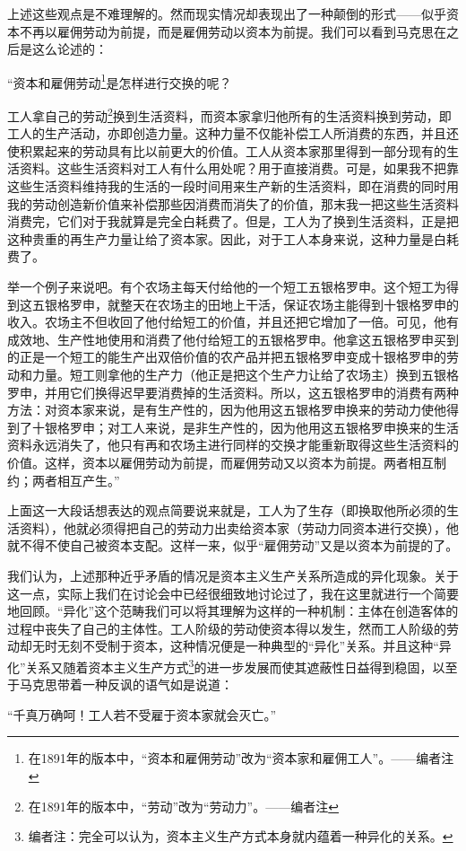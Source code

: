 \documentclass[a4paper,twoside,12pt,AutoFakeBold]{ctexart}
\begin{document}
上述这些观点是不难理解的。然而现实情况却表现出了一种颠倒的形式——似乎资本不再以雇佣劳动为前提，而是雇佣劳动以资本为前提。我们可以看到马克思在之后是这么论述的：
\begin{adjustwidth}{2em}{2em}
    \qquad\fangsong
“资本和雇佣劳动\footnote{在1891年的版本中，“资本和雇佣劳动”改为“资本家和雇佣工人”。——编者注}是怎样进行交换的呢？

工人拿自己的劳动\footnote{在1891年的版本中，“劳动”改为“劳动力”。——编者注}换到生活资料，而资本家拿归他所有的生活资料换到劳动，即工人的生产活动，亦即创造力量。这种力量不仅能补偿工人所消费的东西，并且还使积累起来的劳动具有比以前更大的价值。工人从资本家那里得到一部分现有的生活资料。这些生活资料对工人有什么用处呢？用于直接消费。可是，如果我不把靠这些生活资料维持我的生活的一段时间用来生产新的生活资料，即在消费的同时用我的劳动创造新价值来补偿那些因消费而消失了的价值，那末我一把这些生活资料消费完，它们对于我就算是完全白耗费了。但是，工人为了换到生活资料，正是把这种贵重的再生产力量让给了资本家。因此，对于工人本身来说，这种力量是白耗费了。

举一个例子来说吧。有个农场主每天付给他的一个短工五银格罗申。这个短工为得到这五银格罗申，就整天在农场主的田地上干活，保证农场主能得到十银格罗申的收入。农场主不但收回了他付给短工的价值，并且还把它增加了一倍。可见，他有成效地、生产性地使用和消费了他付给短工的五银格罗申。他拿这五银格罗申买到的正是一个短工的能生产出双倍价值的农产品并把五银格罗申变成十银格罗申的劳动和力量。短工则拿他的生产力（他正是把这个生产力让给了农场主）换到五银格罗申，并用它们换得迟早要消费掉的生活资料。所以，这五银格罗申的消费有两种方法：对资本家来说，是有生产性的，因为他用这五银格罗申换来的劳动力使他得到了十银格罗申；对工人来说，是非生产性的，因为他用这五银格罗申换来的生活资料永远消失了，他只有再和农场主进行同样的交换才能重新取得这些生活资料的价值。这样，资本以雇佣劳动为前提，而雇佣劳动又以资本为前提。两者相互制约；两者相互产生。”
\end{adjustwidth}
上面这一大段话想表达的观点简要说来就是，工人为了生存（即换取他所必须的生活资料），他就必须得把自己的劳动力出卖给资本家（劳动力同资本进行交换），他就不得不使自己被资本支配。这样一来，似乎“雇佣劳动”又是以资本为前提的了。

我们认为，上述那种近乎矛盾的情况是资本主义生产关系所造成的异化现象。关于这一点，实际上我们在讨论会中已经很细致地讨论过了，我在这里就进行一个简要地回顾。“异化”这个范畴我们可以将其理解为这样的一种机制：主体在创造客体的过程中丧失了自己的主体性。工人阶级的劳动使资本得以发生，然而工人阶级的劳动却无时无刻不受制于资本，这种情况便是一种典型的“异化”关系。并且这种“异化”关系又随着资本主义生产方式\footnote{编者注：完全可以认为，资本主义生产方式本身就内蕴着一种异化的关系。}的进一步发展而使其遮蔽性日益得到稳固，以至于马克思带着一种反讽的语气如是说道：
\vspace{0.5cm} %
\begin{adjustwidth}{2em}{2em}
\qquad\fangsong
“千真万确呵！工人若不受雇于资本家就会灭亡。”
\end{adjustwidth}
\end{document}
